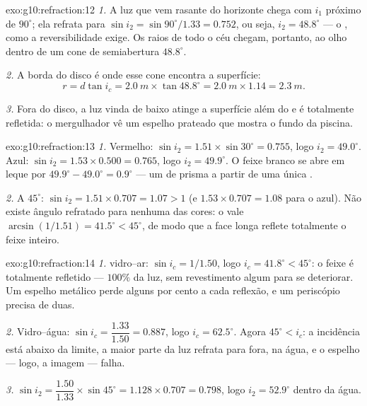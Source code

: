 \begin{solution}{exo:g10:refraction:12}
\emph{1.} A luz que vem rasante do horizonte chega com $i_1$ próximo de
$90^\circ$; ela refrata para $\sin i_2 = \sin 90^\circ / 1.33 = 0.752$,
ou seja, $i_2 = 48.8^\circ$ --- o , como a reversibilidade
exige. Os raios de todo o céu chegam, portanto, ao olho dentro de um cone
de semiabertura $48.8^\circ$.

\emph{2.} A borda do disco é onde esse cone encontra a superfície:
\[
r = d \tan i_c = \qty{2.0}{m} \times \tan 48.8^\circ
= \qty{2.0}{m} \times 1.14 = \qty{2.3}{m}.
\]

\emph{3.} Fora do disco, a luz vinda de baixo atinge a superfície além do
 e é totalmente refletida: o mergulhador vê um espelho
prateado que mostra o fundo da piscina.
\end{solution}

\begin{solution}{exo:g10:refraction:13}
\emph{1.} Vermelho: $\sin i_2 = 1.51 \times \sin 30^\circ = 0.755$, logo
$i_2 = 49.0^\circ$. Azul: $\sin i_2 = 1.53 \times 0.500 = 0.765$, logo
$i_2 = 49.9^\circ$. O feixe branco se abre em leque por
$49.9^\circ - 49.0^\circ = 0.9^\circ$ --- um  de prisma a partir
de uma única .

\emph{2.} A $45^\circ$: $\sin i_2 = 1.51 \times 0.707 = 1.07 > 1$ (e
$1.53 \times 0.707 = 1.08$ para o azul). Não existe ângulo refratado para
nenhuma das cores: o  vale
$\arcsin(1/1.51) = 41.5^\circ < 45^\circ$, de modo que a face longa
reflete totalmente o feixe inteiro.
\end{solution}

\begin{solution}{exo:g10:refraction:14}
\emph{1.}  vidro--ar: $\sin i_c = 1/1.50$, logo
$i_c = 41.8^\circ < 45^\circ$: o feixe é totalmente refletido ---
$100\%$ da luz, sem revestimento algum para se deteriorar. Um espelho
metálico perde alguns por cento a cada reflexão, e um periscópio precisa
de duas.

\emph{2.} Vidro--água: $\sin i_c = \dfrac{1.33}{1.50} = 0.887$, logo
$i_c = 62.5^\circ$. Agora $45^\circ < i_c$: a incidência está abaixo da
limite, a maior parte da luz refrata para fora, na água, e o espelho ---
logo, a imagem --- falha.

\emph{3.} $\sin i_2 = \dfrac{1.50}{1.33} \times \sin 45^\circ
= 1.128 \times 0.707 = 0.798$, logo $i_2 = 52.9^\circ$ dentro da água.
\end{solution}

